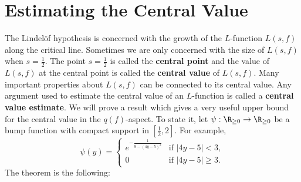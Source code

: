   \section{}
  \section{Estimating the Central Value}
    The Lindel\"of hypothesis is concerned with the growth of the $L$-function $L(s,f)$ along the critical line. Sometimes we are only concerned with the size of $L(s,f)$ when $s = \frac{1}{2}$. The point $s = \frac{1}{2}$ is called the \textbf{central point} and the value of $L(s,f)$ at the central point is called the \textbf{central value} of $L(s,f)$. Many important properties about $L(s,f)$ can be connected to its central value. Any argument used to estimate the central value of an $L$-function is called a \textbf{central value estimate}. We will prove a result which gives a very useful upper bound for the central value in the $q(f)$-aspect. To state it, let $\psi:\R_{\ge 0} \to \R_{\ge 0}$ be a bump function with compact support in $\left[\frac{1}{2},2\right]$. For example,
    \[
      \psi(y) = \begin{cases} e^{-\frac{1}{9-(4y-5)^{2}}} & \text{if $|4y-5| < 3$}, \\ 0 & \text{if $|4y-5| \ge 3$}. \end{cases}
    \]
    The theorem is the following:

